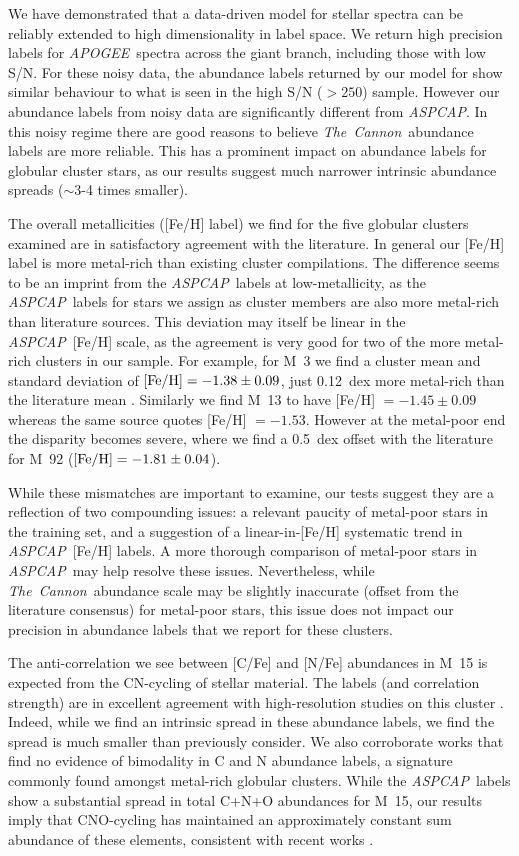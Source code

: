 \documentclass[12pt,preprint]{aastex}
\newcommand{\project}[1]{\textsl{#1}}
\newcommand{\TheCannon}{\project{The~Cannon}}
\newcommand{\acronym}[1]{{\small{#1}}}
\newcommand{\apogee}{\project{\acronym{APOGEE}}}
\newcommand{\aspcap}{\project{\acronym{ASPCAP}}}
\begin{document}
We have demonstrated that a data-driven model for stellar spectra can be
reliably extended to high dimensionality in label space. We return high
precision labels for \apogee\ spectra across the giant branch, including
those with low S/N. For these noisy data, the abundance labels returned
by our model for show similar behaviour to what is seen in the high
S/N ($>250$) sample.  However our abundance labels from noisy data are
significantly different from \aspcap. In this noisy regime
there are good reasons to believe \TheCannon\ abundance labels are more
reliable.  This has a prominent impact on abundance labels for globular
cluster stars, as our results suggest much narrower intrinsic abundance
spreads ($\sim$3-4 times smaller).


The overall metallicities ([Fe/H] label) we find for the five globular
clusters examined are in satisfactory agreement with the literature.  In
general our [Fe/H] label is more metal-rich than existing cluster
compilations.  The difference seems to be an imprint from
the \aspcap\ labels at low-metallicity, as the \aspcap\ labels for 
stars we assign as cluster members are also more metal-rich than
literature sources. This deviation may itself be linear in the 
\aspcap\ [Fe/H] scale, as the agreement is very good for two of the
more metal-rich clusters in our sample.  For example, for M~3 we find a cluster mean and standard
deviation of $[{\rm Fe/H}] = -1.38 \pm 0.09$, just 0.12~dex more metal-rich
than the literature mean \citep{Harris}.  Similarly we find M~13 to have
[Fe/H] $= -1.45 \pm 0.09$ whereas the same source quotes [Fe/H] $= -1.53$.
However at the metal-poor end the disparity becomes severe, where we find
a 0.5~dex offset with the literature for M~92 ($[{\rm Fe/H}] = -1.81 \pm 0.04$).


While these mismatches are important to examine, our tests suggest they
are a reflection of two compounding issues: a relevant paucity of metal-poor
stars in the training set, and a suggestion of a linear-in-[Fe/H] systematic
trend in \aspcap\ [Fe/H] labels.  A more thorough comparison of metal-poor
stars in \aspcap\ may help resolve these issues.  Nevertheless, while
\TheCannon\ abundance scale may be slightly inaccurate (offset from the
literature consensus) for metal-poor stars, this issue does not impact
our precision in abundance labels that we report for these clusters.  



The anti-correlation we see between [C/Fe] and [N/Fe] abundances in M~15 is
expected from the CN-cycling of stellar material.  The labels (and correlation
strength) are in excellent agreement with high-resolution studies on this cluster
\citep{Cohen_2005}.  Indeed, while we find an intrinsic spread in these abundance
labels, we find the spread is much smaller than previously consider.  We also
corroborate works that find no evidence of bimodality in C and N 
abundance labels, a signature commonly found amongst metal-rich globular clusters.
While the \aspcap\ labels show a substantial spread in total C+N+O abundances
for M~15, our results imply that CNO-cycling has maintained an approximately
constant sum abundance of these elements, consistent with recent works
\citep{Meszaros_2015}.
\end{document}
